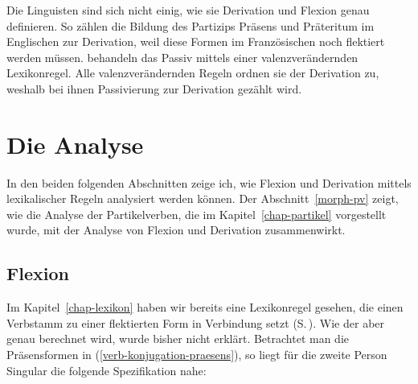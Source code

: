 \noindent
Die Linguisten sind sich nicht einig, wie sie Derivation und Flexion genau definieren.
So zählen \citet*[--264]{SWB2003a} die Bildung des Partizips Präsens und Präteritum im Englischen
zur Derivation, weil diese Formen im Französischen noch flektiert werden müssen.
\citet*[]{SWB2003a} behandeln das Passiv mittels einer valenzverändernden Lexikonregel.
Alle valenzverändernden Regeln ordnen sie der Derivation zu, weshalb bei ihnen Passivierung
zur Derivation gezählt wird.

\section{Die Analyse}

In den beiden folgenden Abschnitten zeige ich, wie Flexion und Derivation mittels lexikalischer Regeln
analysiert werden können. Der Abschnitt~\ref{morph-pv} zeigt, wie die Analyse der Partikelverben, die
im Kapitel~\ref{chap-partikel} vorgestellt wurde, mit der Analyse von Flexion und Derivation zusammenwirkt.

\subsection{Flexion}
\label{sec-morph-flex-anal}
\label{sec-inflection-hpsg}

Im Kapitel~\ref{chap-lexikon} haben wir bereits eine Lexikonregel gesehen, die einen Verbstamm zu einer
flektierten Form in Verbindung setzt (S.\,\pageref{passive-lr-mit-phon}). Wie der \phonw aber genau berechnet
wird, wurde bisher nicht erklärt. Betrachtet man die Präsensformen in (\ref{verb-konjugation-praesens}),
so liegt \zb für die zweite Person Singular die folgende Spezifikation
nahe:

